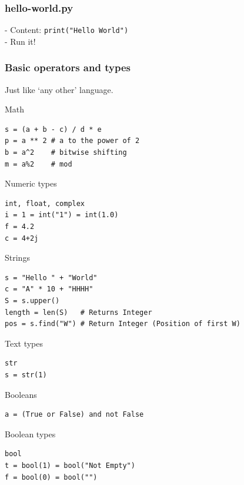 \documentclass{beamer}
\begin{document}
\begin{frame}[fragile]
	\frametitle{hello-world.py}
	- Content: \texttt{print("Hello World")}\\
	- Run it!
\end{frame}
\begin{frame}[fragile]
	\frametitle{Basic operators and types}
	Just like `any other' language.
	\begin{block}{Math}
		\begin{verbatim}
s = (a + b - c) / d * e
p = a ** 2 # a to the power of 2
b = a^2    # bitwise shifting
m = a%2    # mod
		\end{verbatim}
	\end{block}
	\begin{exampleblock}{Numeric types}
	\begin{verbatim}
int, float, complex
i = 1 = int("1") = int(1.0)
f = 4.2
c = 4+2j
	\end{verbatim}
\end{exampleblock}
\end{frame}
\begin{frame}[fragile]
	\begin{block}{Strings}
		\begin{verbatim}
s = "Hello " + "World"
c = "A" * 10 + "HHHH"
S = s.upper()
length = len(S)   # Returns Integer
pos = s.find("W") # Return Integer (Position of first W)
		\end{verbatim}
	\end{block}
	\begin{exampleblock}{Text types}
		\begin{verbatim}
str
s = str(1)
		\end{verbatim}
	\end{exampleblock}
\end{frame}

\begin{frame}[fragile]
	\begin{block}{Booleans}
		\begin{verbatim}
a = (True or False) and not False
		\end{verbatim}
	\end{block}
	\begin{exampleblock}{Boolean types}
		\begin{verbatim}
bool
t = bool(1) = bool("Not Empty")
f = bool(0) = bool("")
		\end{verbatim}
	\end{exampleblock}
\end{frame}
\end{document}
